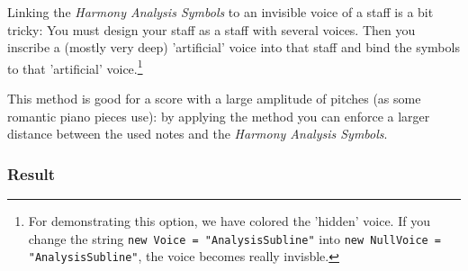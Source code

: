 \documentclass[
  DIV=calc,
  BCOR=5mm,
  12pt,
  headings=small,
  oneside,
  abstract=true,
  toc=bib,
  xcolor=dvipsnames,
  openany,
  ngerman,english]{scrartcl}
\newcommand{\has}[1]{\textit{Harmony Analysis Symbol#1}}
\begin{document}
Linking the \has{s} to an invisible voice of a staff is a bit tricky:
You must design your staff as a staff with several voices. Then you inscribe a
(mostly very deep) 'artificial' voice into that staff and bind the symbols to
that 'artificial' voice.\footnote{For demonstrating this option, we have colored
the 'hidden' voice. If you change the string \texttt{new Voice =
"AnalysisSubline"} into \texttt{new NullVoice = "AnalysisSubline"}, the voice
becomes really invisble.}

This method is good for a score with a large amplitude of pitches (as some
romantic piano pieces use): by applying the method you can enforce a larger
distance between the used notes and the \has{s}.

\subsubsection{Result}
\end{document}
